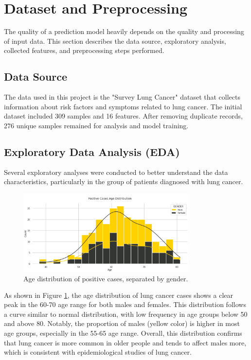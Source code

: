 \section{Dataset and Preprocessing}

The quality of a prediction model heavily depends on the quality and processing of input data. This section describes the data source, exploratory analysis, collected features, and preprocessing steps performed.

\subsection{Data Source}

The data used in this project is the "Survey Lung Cancer" dataset that collects information about risk factors and symptoms related to lung cancer. The initial dataset included 309 samples and 16 features. After removing duplicate records, 276 unique samples remained for analysis and model training.

\subsection{Exploratory Data Analysis (EDA)}

Several exploratory analyses were conducted to better understand the data characteristics, particularly in the group of patients diagnosed with lung cancer.

\begin{figure}[H] %
    \centering
    \includegraphics[width=0.8\textwidth]{Images/positive_cases_age_dist.png}
    \caption{Age distribution of positive cases, separated by gender.}
    \label{fig:age_dist}
\end{figure}

As shown in Figure \ref{fig:age_dist}, the age distribution of lung cancer cases shows a clear peak in the 60-70 age range for both males and females. This distribution follows a curve similar to normal distribution, with low frequency in age groups below 50 and above 80. Notably, the proportion of males (yellow color) is higher in most age groups, especially in the 55-65 age range. Overall, this distribution confirms that lung cancer is more common in older people and tends to affect males more, which is consistent with epidemiological studies of lung cancer.

